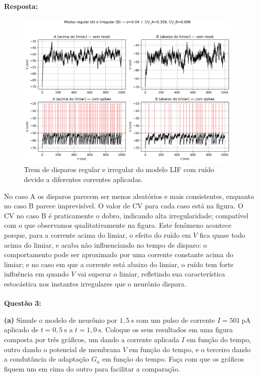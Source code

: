 \documentclass[english,11pt,a4paper]{article}
\begin{document}
	\noindent\textbf{Resposta:}
	
	\begin{figure}[H]
		\centering
		\includegraphics[width=11cm]{../figures/ex_2c.png}
		\caption{Trem de disparos regular e irregular do modelo LIF com ruído devido a diferentes correntes aplicadas.}
	\end{figure}
	
	No caso A os disparos parecem ser menos aleatórios e mais consistentes, enquanto no caso B parece imprevisível. O valor de CV para cada caso está na figura. O CV no caso B é praticamente o dobro, indicando alta irregularidade; compatível com o que observamos qualitativamente na figura. Este fenômeno acontece porque, para a corrente acima do limiar, o efeito do ruído em $V$ fica quase todo acima do limiar, e acaba não influenciando no tempo de disparo: o comportamento pode ser aproximado por uma corrente constante acima do limiar; e no caso em que a corrente está abaixo do limiar, o ruído tem forte influência em quando $V$ vai superar o limiar, refletindo sua característica estocástica nos instantes irregulares que o neurônio dispara.\\\\
	
	\noindent\textbf{Questão 3:}
	

	\noindent \textbf{(a)} Simule o modelo de neurônio por $1{,}5 \ \text{s}$ com um pulso de corrente $I = 501 \ \text{pA}$ aplicado de $t = 0{,}5 \ \text{s}$ a $t = 1{,}0 \ \text{s}$. Coloque os seus resultados em uma figura composta por três gráficos, um dando a corrente aplicada $I$ em função do tempo, outro dando o potencial de membrana $V$ em função do tempo, e o terceiro dando a condutância de adaptação $G_a$ em função do tempo. Faça com que os gráficos fiquem um em cima do outro para facilitar a comparação.
	\\
	
\end{document}
